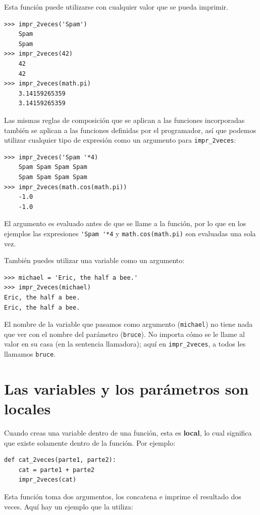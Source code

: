 \documentclass[10pt]{book}
\begin{document}
Esta función puede utilizarse con cualquier valor que se pueda imprimir.

\begin{verbatim}
>>> impr_2veces('Spam')
    Spam
    Spam
>>> impr_2veces(42)
    42
    42
>>> impr_2veces(math.pi)
    3.14159265359
    3.14159265359
\end{verbatim}
%
Las mismas reglas de composición que se aplican a las funciones incorporadas también
se aplican a las funciones definidas por el programador, así que podemos utilizar cualquier tipo de expresión
como un argumento para \verb"impr_2veces":

\begin{verbatim}
>>> impr_2veces('Spam '*4)
    Spam Spam Spam Spam
    Spam Spam Spam Spam
>>> impr_2veces(math.cos(math.pi))
    -1.0
    -1.0
\end{verbatim}
%
El argumento es evaluado antes de que se llame a la función, por lo que
en los ejemplos las expresiones \verb"'Spam '*4" y
{\tt math.cos(math.pi)} son evaluadas una sola vez.

También puedes utilizar una variable como un argumento:

\begin{verbatim}
>>> michael = 'Eric, the half a bee.'
>>> impr_2veces(michael)
Eric, the half a bee.
Eric, the half a bee.
\end{verbatim}
%
El nombre de la variable que pasamos como argumento ({\tt michael}) no tiene
nada que ver con el nombre del parámetro ({\tt bruce}).  No
importa cómo se le llame al valor en su casa (en la sentencia llamadora);
aquí en \verb"impr_2veces", a todos les llamamos {\tt bruce}.


\section{Las variables y los parámetros son locales}

Cuando creas una variable dentro de una función, esta es {\bf local},
lo cual significa que existe
solamente dentro de la función.  Por ejemplo:

\begin{verbatim}
def cat_2veces(parte1, parte2):
    cat = parte1 + parte2
    impr_2veces(cat)
\end{verbatim}
%
Esta función toma dos argumentos, los concatena e imprime
el resultado dos veces.  Aquí hay un ejemplo que la utiliza:
\end{document}
